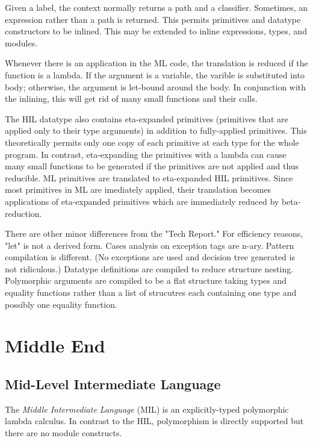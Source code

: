\documentclass[12pt,twoside]{article}
\begin{document}
Given a label, the context normally returns a path and a classifier.
Sometimes, an expression rather than a path is returned.  This permits
primitives and datatype constructors to be inlined.  This may be extended
to inline expressions, types, and modules.

Whenever there is an application in the ML code, the translation is
reduced if the function is a lambda.  If the argument is a variable,
the varible is substituted into body; otherwise, the argument is
let-bound around the body.  In conjunction with the inlining, this
will get rid of many small functions and their calls.

The HIL datatype also contains eta-expanded primitives (primitives
that are applied only to their type arguments) in addition to
fully-applied primitives.  This theoretically permits only one copy of
each primitive at each type for the whole program.  In contrast,
eta-expanding the primitives with a lambda can cause many small functions
to be generated if the primitives are not applied and thus reducible.
ML primitives are translated to eta-expanded HIL primitives.
Since most primitives in ML are imediately applied,
their translation becomes applications of eta-expanded primitives 
which are immediately reduced by beta-reduction.

There are other minor differences from the "Tech Report."  For
efficiency reasons, "let" is not a derived form.  Cases analysis on
exception tags are n-ary.  Pattern compilation is different.  (No
exceptions are used and decision tree generated is not ridiculous.)
Datatype definitions are compiled to reduce structure nesting.
Polymorphic arguments are compiled to be a flat structure taking types
and equality functions rather than a list of strucutres each
containing one type and possibly one equality function.


\section{Middle End}

\subsection{Mid-Level Intermediate Language}

The \textit{Middle Intermediate Language} (MIL) is an explicitly-typed
polymorphic lambda calculus.  In contrast to the HIL, polymorphism is
directly supported but there are no module constructs.  
\end{document}

